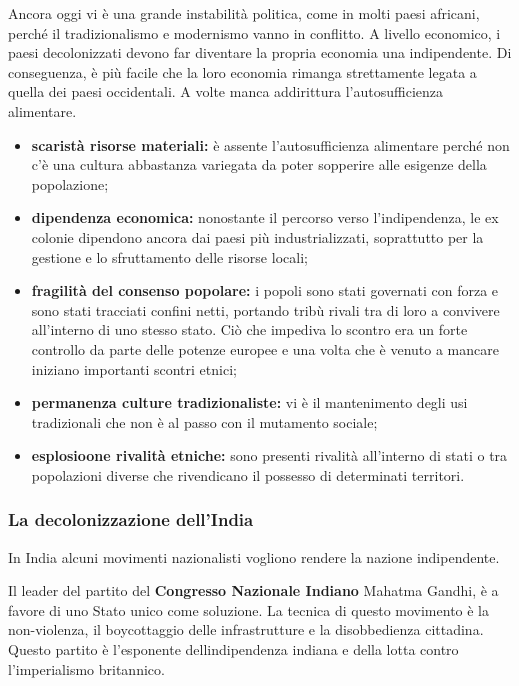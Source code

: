 \documentclass[a4paper]{article}
\begin{document}
Ancora oggi vi è una grande instabilità politica, come in molti paesi africani,
perché il tradizionalismo e modernismo vanno in conflitto.
A livello economico, i paesi decolonizzati
devono far diventare la propria economia una indipendente.
Di conseguenza, è più facile che la loro economia rimanga
strettamente legata a quella dei paesi occidentali.
A volte manca addirittura l'autosufficienza alimentare.
\begin{itemize}
    \item \textbf{scaristà risorse materiali:}
        è assente l'autosufficienza alimentare perché non c'è
        una cultura abbastanza variegata da
        poter sopperire alle esigenze della popolazione;
    \item \textbf{dipendenza economica:}
        nonostante il percorso verso l'indipendenza, le ex colonie dipendono ancora dai paesi più
        industrializzati, soprattutto per la gestione e lo sfruttamento delle risorse locali;
    \item \textbf{fragilità del consenso popolare:}
        i popoli sono stati governati con forza e sono stati tracciati confini netti, portando tribù rivali
        tra di loro a convivere all'interno di uno stesso stato. Ciò che impediva lo scontro era un
        forte controllo da parte delle potenze europee e una volta che è venuto a mancare iniziano
        importanti scontri etnici;
    \item \textbf{permanenza culture tradizionaliste:}
        vi è il mantenimento degli usi tradizionali che non è al passo con il mutamento sociale;
    \item \textbf{esplosioone rivalità etniche:}
        sono presenti rivalità all'interno di stati o tra popolazioni diverse che rivendicano il possesso
        di determinati territori.
\end{itemize}

\subsubsection{La decolonizzazione dell'India}

In India alcuni movimenti nazionalisti vogliono
rendere la nazione indipendente. 

Il leader del partito del \textbf{Congresso Nazionale Indiano} Mahatma Gandhi,
è a favore di uno Stato unico come soluzione.
La tecnica di questo movimento è la non-violenza, il boycottaggio
delle infrastrutture e la disobbedienza cittadina.
Questo partito è l'esponente dellindipendenza indiana e della lotta contro l'imperialismo britannico.
\end{document}
